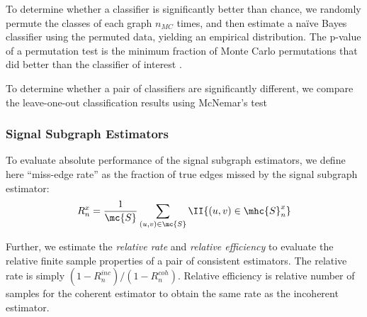 \documentclass[10pt,journal,cspaper,compsoc]{IEEEtran}
\begin{document}
To determine whether a classifier is significantly better than chance, we randomly permute the classes of each graph $n_{MC}$ times, and then estimate a na\"ive Bayes classifier using the permuted data, yielding an empirical distribution.  The p-value of a permutation test is the minimum fraction of Monte Carlo permutations that did better than the classifier of interest \cite{Fisher1971}.  

To determine whether a pair of classifiers are significantly different, we compare the leave-one-out classification results using McNemar's test \cite{McNemar1947}


\subsubsection{Signal Subgraph Estimators} %
\label{ssub:signal_subgraph_estimators}


To evaluate absolute performance of the signal subgraph estimators, we define here ``miss-edge rate'' as the fraction of true edges missed by the signal subgraph estimator:
\begin{align}
R^x_n = \frac{1}{\mc{S}} \sum_{(u,v)\in \mc{S}}\II\{(u,v) \in \mhc{S}^x_n\}
\end{align}

Further, we estimate the \emph{relative rate} and \emph{relative efficiency} to evaluate the relative finite sample properties of a pair of consistent estimators. The relative rate is simply $(1-R^{inc}_n)/(1-R^{coh}_n)$.  Relative efficiency is relative number of samples for the coherent estimator to obtain the same rate as the incoherent estimator.


% 
\end{document}
